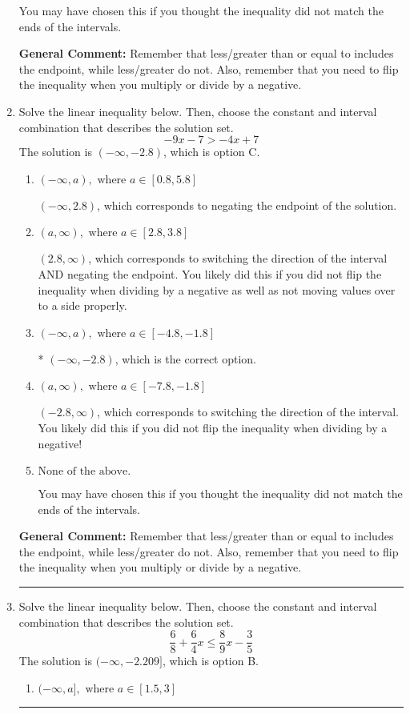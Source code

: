 \documentclass{extbook}[14pt]
\newcommand{\litem}[1]{\item #1

\rule{\textwidth}{0.4pt}}
\begin{document}
\begin{enumerate}
{\begin{enumerate}[label=\Alph*.]
You may have chosen this if you thought the inequality did not match the ends of the intervals.
\end{enumerate}

\textbf{General Comment:} Remember that less/greater than or equal to includes the endpoint, while less/greater do not. Also, remember that you need to flip the inequality when you multiply or divide by a negative.
}
\litem{
Solve the linear inequality below. Then, choose the constant and interval combination that describes the solution set.
\[ -9x -7 > -4x + 7 \]The solution is \( (-\infty, -2.8) \), which is option C.\begin{enumerate}[label=\Alph*.]
\item \( (-\infty, a), \text{ where } a \in [0.8, 5.8] \)

 $(-\infty, 2.8)$, which corresponds to negating the endpoint of the solution.
\item \( (a, \infty), \text{ where } a \in [2.8, 3.8] \)

 $(2.8, \infty)$, which corresponds to switching the direction of the interval AND negating the endpoint. You likely did this if you did not flip the inequality when dividing by a negative as well as not moving values over to a side properly.
\item \( (-\infty, a), \text{ where } a \in [-4.8, -1.8] \)

* $(-\infty, -2.8)$, which is the correct option.
\item \( (a, \infty), \text{ where } a \in [-7.8, -1.8] \)

 $(-2.8, \infty)$, which corresponds to switching the direction of the interval. You likely did this if you did not flip the inequality when dividing by a negative!
\item \( \text{None of the above}. \)

You may have chosen this if you thought the inequality did not match the ends of the intervals.
\end{enumerate}

\textbf{General Comment:} Remember that less/greater than or equal to includes the endpoint, while less/greater do not. Also, remember that you need to flip the inequality when you multiply or divide by a negative.
}
\litem{
Solve the linear inequality below. Then, choose the constant and interval combination that describes the solution set.
\[ \frac{6}{8} + \frac{6}{4} x \leq \frac{8}{9} x - \frac{3}{5} \]The solution is \( (-\infty, -2.209] \), which is option B.\begin{enumerate}[label=\Alph*.]
\item \( (-\infty, a], \text{ where } a \in [1.5, 3] \)


\end{enumerate}}
\end{enumerate}
\end{document}

